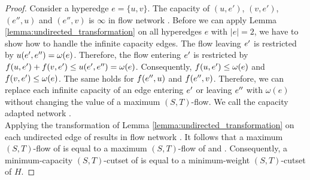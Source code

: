 \begin{proof}
Consider a hyperedge $e = \{u,v\}$. The capacity of
$(u,e')$, $(v,e')$, $(e'',u)$ and $(e'',v)$ is $\infty$ in flow network . 
Before we can apply Lemma \ref{lemma:undirected_transformation} on all hyperedges 
$e$ with $|e| = 2$, we have to show how to handle the infinite capacity edges.
The flow leaving $e'$ is restricted by $u(e',e'') = \omega(e)$. Therefore, the flow entering
$e'$ is restricted by $f(u,e') + f(v,e') \le u(e',e'') = \omega(e)$.
Consequently, $f(u,e') \le \omega(e)$ and $f(v,e') \le \omega(e)$.
The same holds for $f(e'',u)$ and $f(e'',v)$. Therefore, we can replace each infinite 
capacity of an edge entering $e'$ or leaving $e''$ with $\omega(e)$ without changing the value
of a maximum $(S,T)$-flow. We call the capacity adapted network .\\
Applying the transformation of Lemma \ref{lemma:undirected_transformation} on each undirected
edge of  results in flow network . It follows that a maximum $(S,T)$-flow of  is equal
to a maximum $(S,T)$-flow of  and . Consequently, a minimum-capacity
$(S,T)$-cutset of  is equal to a minimum-weight $(S,T)$-cutset of $H$.


\end{proof}
